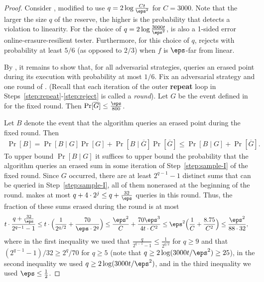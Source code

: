 \documentclass[11pt]{article}
\numberwithin{equation}{section}
\theoremstyle{definition}
\theoremstyle{plain}
\begin{document}
\begin{proof} %

Consider , modified to use $q=2\log \frac{Ct}{\eps^2}$ for $C=3000$. Note that the larger the size $q$ of the reserve, the higher is the probability that  detects a violation to linearity. For the choice of  $q=2\log \frac{3000t}{\eps^2}$,  is also a 1-sided error online-erasure-resilient tester. Furthermore, for this choice of $q$,   rejects with probability at least $5/6$ (as opposed to $2/3$) when $f$ is $\eps$-far from linear. 

By , it remains to show that, for all adversarial strategies,  queries an erased point during its execution with probability at most $1/6$.
%
Fix an adversarial strategy and one round of . (Recall that each iteration of the outer \textbf{repeat} loop in Steps~\ref{step:repeat}-\ref{step:reject} is called a {\em round}). Let $G$ be the event defined in  for the fixed round. Then $\Pr[\overline{G}] \leq \frac{\eps}{800}$. 

Let $B$ denote the event that the algorithm queries an erased point during the fixed round. Then
\begin{align*}
    \Pr[B] = \Pr[B \mid G]\Pr[G] + \Pr[B \mid \overline{G}]\Pr[\overline{G}] \leq \Pr[B \mid G] + \Pr[\overline{G}].
\end{align*}
To upper bound $\Pr[B \mid G]$ it suffices to upper bound the probability that the algorithm queries an erased sum in some iteration of Step~\ref{step:sample-I} of the fixed round. Since $G$ occurred, there are at least $2^{q-1}-1$ distinct sums that can be queried in Step~\ref{step:sample-I}, all of them nonerased at the beginning of the round.  makes at most $q + 4\cdot 2^j \leq q + \frac{32}{\eps}$ queries in this round. Thus, the fraction of these sums erased during the round is at most
\begin{align*}
    t\cdot\frac{q + \frac{32}{\eps}}{2^{q-1}-1}
   &\leq  t\cdot \Big(\frac{1}{2^{q/2}} + \frac{70}{\eps \cdot 2^{q}} \Big)
   \leq 
 \frac{\eps^2}{C} + \frac{70\eps^3}{4t \cdot C^2 }  
   \leq   \eps^2 \Bigl( \frac{1}{C} +  \frac{8.75}{C^2} \Bigr)
   \leq \frac{\eps^2}{88\cdot 32},
\end{align*}
where in the first inequality we used that $\frac{q}{2^{q-1}-1} \leq \frac{1}{2^{q/2}}$  for $q \geq 9$ and that $(2^{q-1}-1)/32\geq  2^{q}/70$ for $q\geq 5$ (note that $q \geq 2\log(3000t/\eps^2)\geq  25$), in the second inequality we used $q \geq 2\log(3000t/\eps^2)$, and in the third inequality we used $\eps \leq \frac{1}{2}$. 


\end{proof}
\end{document}
